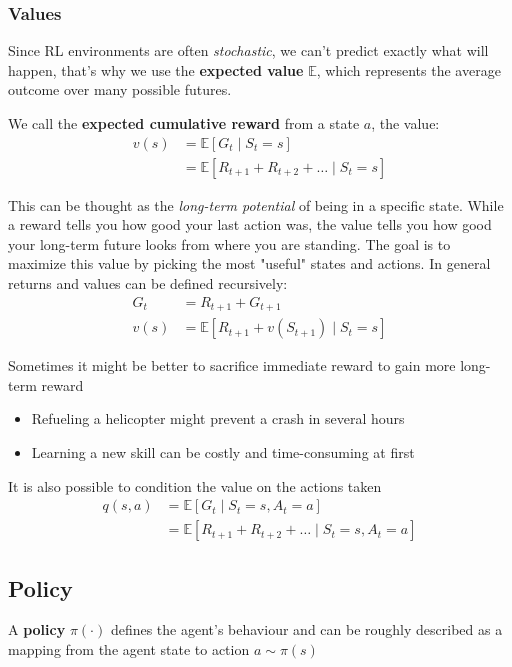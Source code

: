 \subsubsection{Values}
\begin{tcolorbox}[colframe=black, coltitle=white, title=Note, fonttitle=\bfseries]Since RL environments are often \textit{stochastic}, we can't predict exactly what will happen, that's why we use the \textbf{expected value} $\mathbb{E}$, which represents the average outcome over many possible futures.
\end{tcolorbox}

We call the \textbf{expected cumulative reward} from a state $a$, the value:
\begin{align*}
    v(s) &= \mathbb{E}[G_t \mid S_t = s] \\
         &= \mathbb{E}[R_{t+1} + R_{t+2} + \dots \mid S_t=s]
\end{align*}

This can be thought as the \textit{long-term potential} of being in a specific state. While a reward tells you how good your last action was, the value tells you how good your long-term future looks from where you are standing. The goal is to maximize this value by picking the most "useful" states and actions. In general returns and values can be defined recursively:
\begin{align*}
    G_t &= R_{t+1} + G_{t+1} \\
    v(s) &= \mathbb{E}[R_{t+1} + v(S_{t+1}) \mid S_t = s]
\end{align*}

\noindent
Sometimes it might be better to sacrifice immediate reward to gain more long-term reward
\begin{itemize}
    \item Refueling a helicopter might prevent a crash in several hours
    \item Learning a new skill can be costly and time-consuming at first
\end{itemize}

It is also possible to condition the value on the actions taken
\begin{align*}
    q(s,a) &= \mathbb{E}[G_t \mid S_t=s, A_t = a] \\
            &= \mathbb{E}[R_{t+1}+ R_{t+2} + \dots \mid S_t = s, A_t = a]
\end{align*}

\subsection{Policy}
A \textbf{policy} $\pi(\cdot)$ defines the agent's behaviour and can be roughly described as a mapping from the agent state to action $a \sim \pi(s)$

